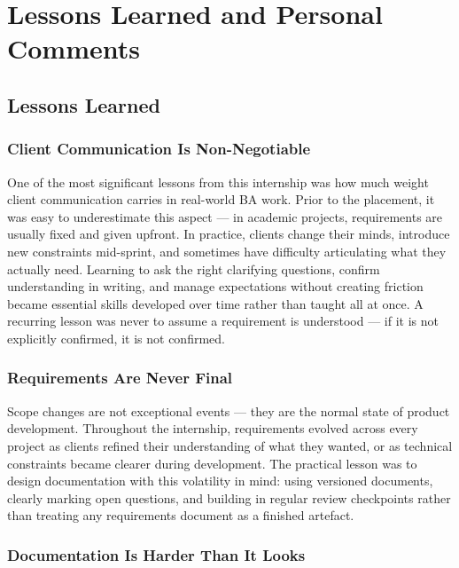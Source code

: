 \chapter{Lessons Learned and Personal Comments}
\label{chap:lessons}

\section{Lessons Learned}

\subsection{Client Communication Is Non-Negotiable}

One of the most significant lessons from this internship was how much weight client communication carries in real-world BA work. Prior to the placement, it was easy to underestimate this aspect — in academic projects, requirements are usually fixed and given upfront. In practice, clients change their minds, introduce new constraints mid-sprint, and sometimes have difficulty articulating what they actually need. Learning to ask the right clarifying questions, confirm understanding in writing, and manage expectations without creating friction became essential skills developed over time rather than taught all at once. A recurring lesson was never to assume a requirement is understood — if it is not explicitly confirmed, it is not confirmed.

\subsection{Requirements Are Never Final}

Scope changes are not exceptional events — they are the normal state of product development. Throughout the internship, requirements evolved across every project as clients refined their understanding of what they wanted, or as technical constraints became clearer during development. The practical lesson was to design documentation with this volatility in mind: using versioned documents, clearly marking open questions, and building in regular review checkpoints rather than treating any requirements document as a finished artefact.

\subsection{Documentation Is Harder Than It Looks}

